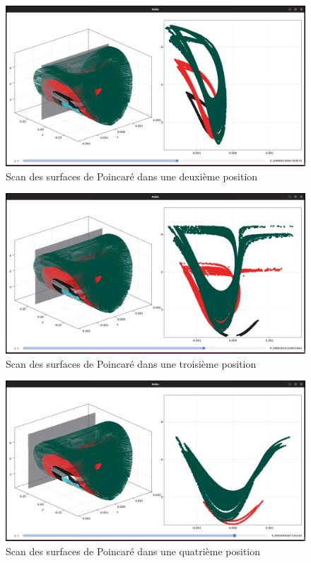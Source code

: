 \documentclass[a4paper, french, 12pt, titlepage]{article}
\begin{document}
\begin{figure}[H]
\begin{center}
  \includegraphics[width=\linewidth]{poincarescan_1.png}
  \caption{Scan des surfaces de Poincaré dans une deuxième position}
  \label{fig:fig12}
  \end{center}
\end{figure}

\begin{figure}[H]
  \includegraphics[width=\linewidth]{poincarescan_2.png}
  \caption{Scan des surfaces de Poincaré dans une troisième position}
  \label{fig:fig13}
\end{figure}

\begin{figure}[H]
  \includegraphics[width=\linewidth]{poincarescan_3.png}
  \caption{Scan des surfaces de Poincaré dans une quatrième position}
  \label{fig:fig14}
\end{figure}
\end{document}
